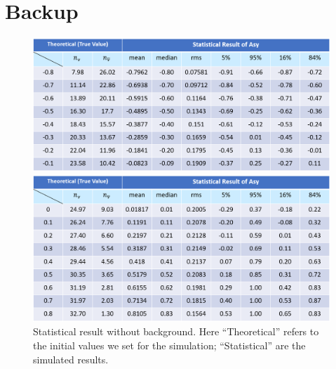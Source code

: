 \documentclass[a4paper,12pt]{article}
\begin{document}
\section{Backup}
\begin{figure}[H]
\begin{minipage}[t]{0.25\linewidth}
\centering
\includegraphics[width=5.5in]{Images/table_noBKG.png}
\end{minipage}%

\begin{minipage}[t]{0.25\linewidth}
\centering
\includegraphics[width=5.5in]{Images/table_noBKG_2.png}
\end{minipage}%
\caption{ Statistical result without background. Here “Theoretical” refers to the initial values we set for the simulation; “Statistical” are the simulated results.}
\label{parts_noBKG}
\end{figure}
\end{document}
